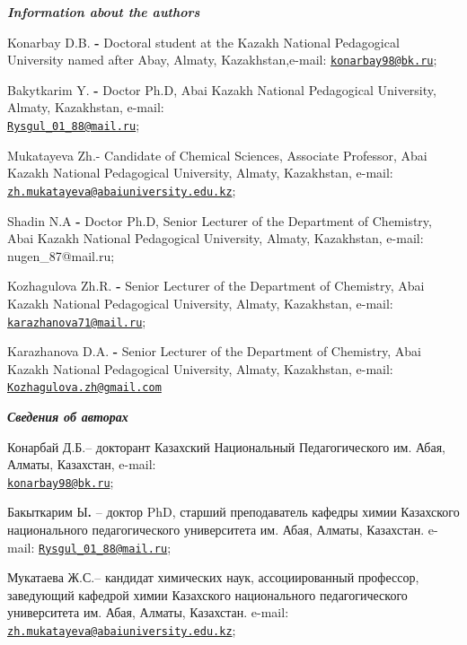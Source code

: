 \begin{authorinfo}
\emph{{\bfseries Information about the authors}}

Konarbay D.B. {\bfseries -} Doctoral student at the Kazakh National
Pedagogical University named after Abay, Almaty, Kazakhstan,e-mail:
\href{mailto:konarbay98@bk.ru}{\nolinkurl{konarbay98@bk.ru}};

Bakytkarim Y. {\bfseries -} Doctor Ph.D, Abai Kazakh National
Pedagogical University, Almaty, Kazakhstan, e-mail:\\
\href{mailto:Rysgul_01_88@mail.ru}{\nolinkurl{Rysgul\_01\_88@mail.ru}};

Mukatayeva Zh.- Can{\bfseries }didate of Chemical Sciences, Associate
Professor, Abai Kazakh National Pedagogical University, Almaty,
Kazakhstan, e-mail:
\href{mailto:zh.mukatayeva@abaiuniversity.edu.kz}{\nolinkurl{zh.mukatayeva@abaiuniversity.edu.kz}};

Shadin N.A {\bfseries -} Doc{\bfseries }tor Ph.D, Senior Lecturer of the
Department of Chemistry, Abai Kazakh National Pedagogical
University, Almaty, Kazakhstan, e-mail: nugen\_87@mail.ru;

Kozhagulova Zh.R. {\bfseries -} Senior Lecturer of the Department of
Chemistry, Abai Kazakh National Pedagogical University, Almaty,
Kazakhstan, e-mail:
\href{mailto:karazhanova71@mail.ru}{\nolinkurl{karazhanova71@mail.ru}};

Karazhanova D.A. {\bfseries -} Senior Lecturer of the Department of
Chemistry, Abai Kazakh National Pedagogical University, Almaty,
Kazakhstan, e-mail:
\href{mailto:Kozhagulova.zh@gmail.com}{\nolinkurl{Kozhagulova.zh@gmail.com}}

\emph{{\bfseries Сведения об авторах}}

Конарбай Д.Б.-- докторант Казахский Национальный Педагогического им.
Абая, Алматы, Казахстан, e-mail:\\
\href{mailto:konarbay98@bk.ru}{\nolinkurl{konarbay98@bk.ru}};

Бакыткарим Ы{\bfseries .} -- доктор PhD, старший преподаватель
кафедры химии Казахского национального педагогического
университета им. Абая, Алматы, Казахстан. e-mail:
\href{mailto:Rysgul_01_88@mail.ru}{\nolinkurl{Rysgul\_01\_88@mail.ru}};

Мукатаева Ж.С.-- кандидат химических наук, ассоциированный
профессор, заведующий кафедрой химии Казахского национального
педагогического университета им. Абая, Алматы, Казахстан. e-mail:
\href{mailto:zh.mukatayeva@abaiuniversity.edu.kz}{\nolinkurl{zh.mukatayeva@abaiuniversity.edu.kz}};


\end{authorinfo}
